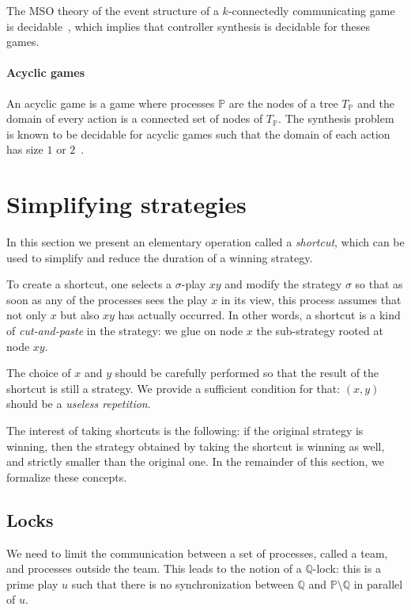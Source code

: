 \documentclass[a4paper,UKenglish]{lipics-v2016}
\newcommand{\PP}{\mathbb{P}}
\newcommand{\QQ}{\mathbb{Q}}
\begin{document}
The MSO theory of the event structure
of a $k$-connectedly communicating game is decidable~\cite{madhu},
which implies that controller synthesis is decidable for theses games.




\paragraph*{Acyclic games}
An acyclic game is a game where processes $\PP$ are the nodes of a tree $T_\PP$
and the domain of every action is a connected set of nodes of $T_\PP$.
The synthesis problem is known to be decidable
for acyclic games such that the domain of each action has size $1$ or $2$~\cite{acyclic}.


\section{Simplifying strategies}
\label{sec:simplifying}

In this section we present an elementary operation called a \emph{shortcut},
which can be used to simplify and reduce the duration of a winning strategy.

To create a shortcut, one selects a $\sigma$-play $xy$
and modify the strategy $\sigma$ so that as soon as any of the processes
sees the play $x$ in its view, this process assumes that not only $x$ but also $xy$ has actually occurred.
In other words, a shortcut is a kind of \emph{cut-and-paste} in the strategy:
we glue on node $x$ the sub-strategy rooted at node $xy$.

The choice of $x$ and $y$ should be carefully performed so that 
the result of the shortcut
is still a strategy.
We provide a sufficient condition for that: $(x,y)$ should be a  \emph{useless repetition}.

The interest of taking shortcuts is the following:
if the original strategy is winning,
then the  strategy obtained by taking the shortcut
is winning as well,
and strictly smaller than the original one.
In the remainder of this section, we formalize these concepts.



\subsection{Locks}

We need to limit the communication between a set of processes,
called a team, and processes outside the team.
This leads to the notion of a $\QQ$-lock:
this is a prime play $u$
such that there is no synchronization  between $\QQ$ and $\PP\setminus \QQ$ in parallel of $u$.
\end{document}
